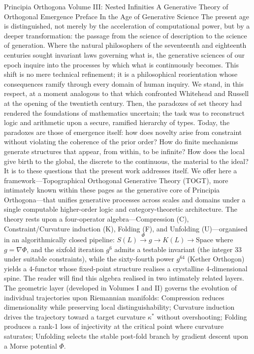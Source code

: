 Principia Orthogona
Volume III: Nested Infinities
A Generative Theory of Orthogonal Emergence
Preface
In the Age of Generative Science
The present age is distinguished, not merely by the acceleration of computational power, but by a deeper transformation: the passage from the science of description to the science of generation. Where the natural philosophers of the seventeenth and eighteenth centuries sought invariant laws governing what is, the generative sciences of our epoch inquire into the processes by which what is continuously becomes. This shift is no mere technical refinement; it is a philosophical reorientation whose consequences ramify through every domain of human inquiry.
We stand, in this respect, at a moment analogous to that which confronted Whitehead and Russell at the opening of the twentieth century. Then, the paradoxes of set theory had rendered the foundations of mathematics uncertain; the task was to reconstruct logic and arithmetic upon a secure, ramified hierarchy of types. Today, the paradoxes are those of emergence itself: how does novelty arise from constraint without violating the coherence of the prior order? How do finite mechanisms generate structures that appear, from within, to be infinite? How does the local give birth to the global, the discrete to the continuous, the material to the ideal?
It is to these questions that the present work addresses itself. We offer here a framework—Topographical Orthogonal Generative Theory (TOGT), more intimately known within these pages as the generative core of Principia Orthogona—that unifies generative processes across scales and domains under a single computable higher-order logic and category-theoretic architecture. The theory rests upon a four-operator algebra—Compression (C), Constraint/Curvature induction (K), Folding (F), and Unfolding (U)—organised in an algorithmically closed pipeline:
$   S(L) \xrightarrow{\Phi} g \to K(L) \to \text{Space}   $
where $  g = \nabla \Phi  $, and the sixfold iteration $  g^6  $ admits a testable invariant (the integer 33 under suitable constraints), while the sixty-fourth power $  g^{64}  $ (Kether Orthogon) yields a 4-functor whose fixed-point structure realises a crystalline 4-dimensional spine.
The reader will find this algebra realised in two intimately related layers. The geometric layer (developed in Volumes I and II) governs the evolution of individual trajectories upon Riemannian manifolds: Compression reduces dimensionality while preserving local distinguishability; Curvature induction drives the trajectory toward a target curvature $  \kappa^*  $ without overshooting; Folding produces a rank-1 loss of injectivity at the critical point where curvature saturates; Unfolding selects the stable post-fold branch by gradient descent upon a Morse potential $  \Phi  $.

